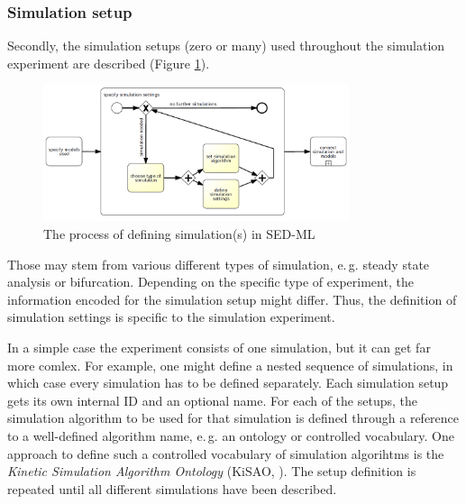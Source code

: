 \subsubsection{Simulation setup}
\label{overview:simulation}
Secondly, the simulation setups (zero or many) used throughout the simulation experiment are described (Figure \ref{fig:workflowSimulation}). 
%
%
\begin{figure}[h]
\centering
\includegraphics[width=0.8\textwidth]{images/bpmn/sedSimulationOryx.png}
\caption{The process of defining simulation(s) in SED-ML}
\label{fig:workflowSimulation}
\end{figure}
%
Those may stem from various different types of simulation, e.\,g. steady state analysis or bifurcation.  Depending on the specific type of experiment, the information encoded for the simulation setup might differ. Thus, the definition of simulation settings is specific to the simulation experiment.

In a simple case the experiment consists of one simulation, but it can get far more comlex. For example, one might define a nested sequence of simulations, in which case every simulation has to be defined separately.
Each simulation setup gets its own internal ID and an optional name. For each of the setups, the simulation algorithm to be used for that simulation is defined through a reference to a well-defined algorithm name, e.\,g. an ontology or controlled vocabulary. One approach to define such a controlled vocabulary of simulation algorihtms is the \emph{Kinetic Simulation Algorithm Ontology} (KiSAO, \cite{CWK+10}). 
%
The setup definition is repeated until all different simulations have been described.

